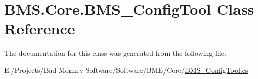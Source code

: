 \hypertarget{class_b_m_s_1_1_core_1_1_b_m_s___config_tool}{\section{B\-M\-S.\-Core.\-B\-M\-S\-\_\-\-Config\-Tool Class Reference}
\label{class_b_m_s_1_1_core_1_1_b_m_s___config_tool}
}


The documentation for this class was generated from the following file\-:\begin{DoxyCompactItemize}
\item 
E\-:/\-Projects/\-Bad Monkey Software/\-Software/\-B\-M\-E/\-Core/\hyperlink{_b_m_s___config_tool_8cs}{B\-M\-S\-\_\-\-Config\-Tool.\-cs}\end{DoxyCompactItemize}

